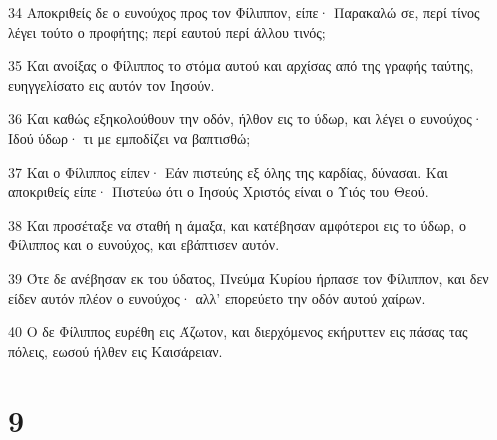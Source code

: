 \par 34 Αποκριθείς δε ο ευνούχος προς τον Φίλιππον, είπε· Παρακαλώ σε, περί τίνος λέγει τούτο ο προφήτης; περί εαυτού περί άλλου τινός;
\par 35 Και ανοίξας ο Φίλιππος το στόμα αυτού και αρχίσας από της γραφής ταύτης, ευηγγελίσατο εις αυτόν τον Ιησούν.
\par 36 Και καθώς εξηκολούθουν την οδόν, ήλθον εις το ύδωρ, και λέγει ο ευνούχος· Ιδού ύδωρ· τι με εμποδίζει να βαπτισθώ;
\par 37 Και ο Φίλιππος είπεν· Εάν πιστεύης εξ όλης της καρδίας, δύνασαι. Και αποκριθείς είπε· Πιστεύω ότι ο Ιησούς Χριστός είναι ο Υιός του Θεού.
\par 38 Και προσέταξε να σταθή η άμαξα, και κατέβησαν αμφότεροι εις το ύδωρ, ο Φίλιππος και ο ευνούχος, και εβάπτισεν αυτόν.
\par 39 Ότε δε ανέβησαν εκ του ύδατος, Πνεύμα Κυρίου ήρπασε τον Φίλιππον, και δεν είδεν αυτόν πλέον ο ευνούχος· αλλ' επορεύετο την οδόν αυτού χαίρων.
\par 40 Ο δε Φίλιππος ευρέθη εις Άζωτον, και διερχόμενος εκήρυττεν εις πάσας τας πόλεις, εωσού ήλθεν εις Καισάρειαν.

\chapter{9}

